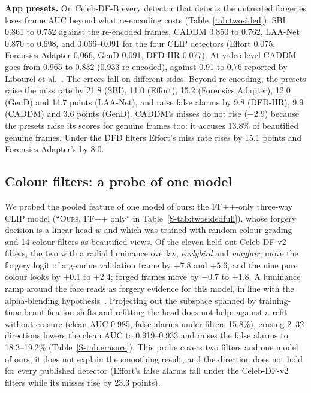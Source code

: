 \documentclass[conference]{IEEEtran}
\newcommand{\ours}{\textsc{Ours}}
\begin{document}
\textbf{App presets.} On Celeb-DF-B every detector that detects the untreated forgeries loses frame AUC beyond what
re-encoding costs (Table~\ref{tab:twosided}): SBI 0.861 to 0.752 against the re-encoded frames, CADDM 0.850 to 0.762, LAA-Net
0.870 to 0.698, and 0.066--0.091 for the four CLIP detectors (Effort 0.075, Forensics Adapter 0.066, GenD 0.091, DFD-HR
0.077). At video level CADDM goes from 0.965 to 0.832 (0.933 re-encoded), against 0.91 to 0.76 reported by Libourel et al.~\cite{libourel2024}. The
errors fall on different sides. Beyond re-encoding, the presets raise the miss rate by 21.8 (SBI), 11.0 (Effort), 15.2
(Forensics Adapter), 12.0 (GenD) and 14.7 points (LAA-Net), and raise false alarms by 9.8 (DFD-HR), 9.9 (CADDM) and 3.6 points
(GenD). CADDM's misses do not rise ($-2.9$) because the presets raise its scores for genuine frames too: it accuses 13.8\% of
beautified genuine frames. Under the DFD filters Effort's miss rate rises by 15.1 points and Forensics Adapter's by 8.0.

\subsection{Colour filters: a probe of one model}
\label{sec:mechanism}
We probed the pooled feature of one model of ours: the FF++-only three-way CLIP model (``\ours{}, FF++ only'' in
Table~\ref{S-tab:twosidedfull}), whose forgery decision is a linear head $w$ and which was trained with random colour grading and
14 colour filters as beautified views. Of the eleven held-out Celeb-DF-v2 filters, the two with a
radial luminance overlay, \emph{earlybird} and \emph{mayfair}, move the forgery logit of a genuine validation frame by $+7.8$
and $+5.6$, and the nine pure colour looks by $+0.1$ to $+2.4$; forged frames move by $-0.7$ to $+1.8$. A luminance ramp around
the face reads as forgery evidence for this model, in line with the alpha-blending hypothesis~\cite{alphablend2026}. Projecting
out the subspace spanned by training-time beautification shifts and refitting the head does not help: against a refit without
erasure (clean AUC 0.985, false alarms under filters 15.8\%), erasing 2--32 directions lowers the clean AUC to 0.919--0.933 and
raises the false alarms to 18.3--19.2\% (Table~\ref{S-tab:erasure}). This probe covers two filters and one model of ours; it
does not explain the smoothing result, and the direction does not hold for every published detector (Effort's false alarms
fall under the Celeb-DF-v2 filters while its misses rise by 23.3 points).
\end{document}
